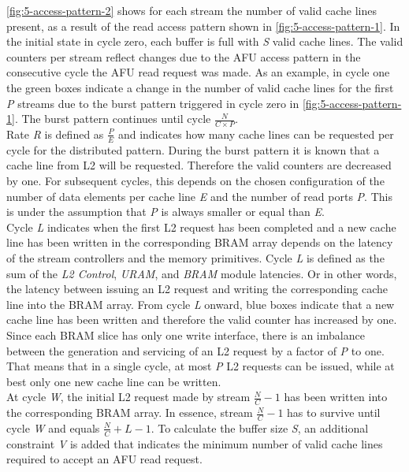 \autoref{fig:5-access-pattern-2} shows for each stream the number of valid cache lines present, as a result of the read access pattern shown in \autoref{fig:5-access-pattern-1}. In the initial state in cycle zero, each buffer is full with \textit{S} valid cache lines. The valid counters per stream reflect changes due to the AFU access pattern in the consecutive cycle the AFU read request was made. As an example, in cycle one the green boxes indicate a change in the number of valid cache lines for the first \textit{P} streams due to the burst pattern triggered in cycle zero in \autoref{fig:5-access-pattern-1}. The burst pattern continues until cycle $\frac{N}{C \times P}$.\\
Rate \textit{R} is defined as $\frac{P}{E}$ and indicates how many cache lines can be requested per cycle for the distributed pattern. During the burst pattern it is known that a cache line from L2 will be requested. Therefore the valid counters are decreased by one. For subsequent cycles, this depends on the chosen configuration of the number of data elements per cache line \textit{E} and the number of read ports \textit{P}. This is under the assumption that \textit{P} is always smaller or equal than \textit{E}.\\
Cycle \textit{L} indicates when the first L2 request has been completed and a new cache line has been written in the corresponding BRAM array depends on the latency of the stream controllers and the memory primitives. Cycle \textit{L} is defined as the sum of the \textit{L2 Control}, \textit{URAM}, and \textit{BRAM} module latencies. Or in other words, the latency between issuing an L2 request and writing the corresponding cache line into the BRAM array. From cycle \textit{L} onward, blue boxes indicate that a new cache line has been written and therefore the valid counter has increased by one. Since each BRAM slice has only one write interface, there is an imbalance between the generation and servicing of an L2 request by a factor of \textit{P} to one. That means that in a single cycle, at most \textit{P} L2 requests can be issued, while at best only one new cache line can be written.\\
At cycle \textit{W}, the initial L2 request made by stream $\frac{N}{C}-1$ has been written into the corresponding BRAM array. In essence, stream $\frac{N}{C}-1$ has to survive until cycle \textit{W} and equals $\frac{N}{C}+L-1$. To calculate the buffer size \textit{S}, an additional constraint \textit{V} is added that indicates the minimum number of valid cache lines required to accept an AFU read request.

